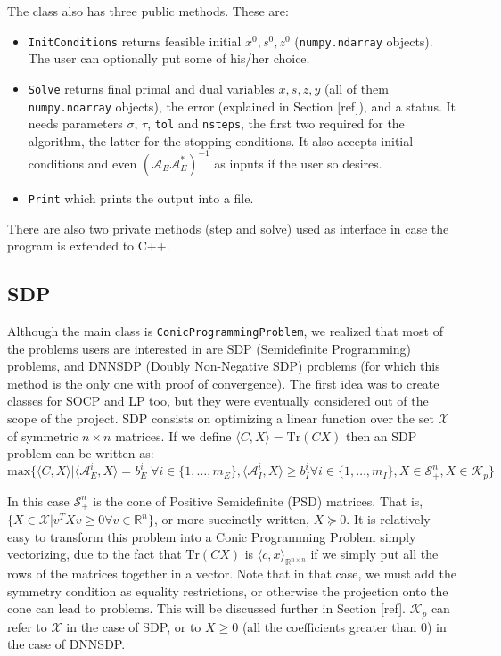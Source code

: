 \documentclass[paper=a4, fontsize=11pt]{scrartcl}
\numberwithin{equation}{section}		%
\numberwithin{figure}{section}			%
\numberwithin{table}{section}				%
\begin{document}
The class also has three public methods. These are:
\begin{itemize}
\item \texttt{InitConditions} returns feasible initial $x^0,s^0,z^0$ (\texttt{numpy.ndarray} objects). The user can optionally put some of his/her choice.
\item \texttt{Solve} returns final primal and dual variables $x,s,z,y$ (all of them \texttt{numpy.ndarray} objects), the error (explained in Section [ref]), and a status. It needs parameters $\sigma$, $\tau$, \texttt{tol} and \texttt{nsteps}, the first two required for the algorithm, the latter for the stopping conditions. It also accepts initial conditions and even $(\mathcal{A}_E\mathcal{A}_E^*)^{-1}$ as inputs if the user so desires.
\item \texttt{Print} which prints the output into a file.
\end{itemize}

There are also two private methods (step and solve) used as interface in case the program is extended to C++.
\subsection{SDP}

Although the main class is \texttt{ConicProgrammingProblem}, we realized that most of the problems users are interested in are SDP (Semidefinite Programming) problems, and DNNSDP (Doubly Non-Negative SDP) problems (for which this method is the only one with proof of convergence). The first idea was to create classes for SOCP and LP too, but they were eventually considered out of the scope of the project. SDP consists on optimizing a linear function over the set $\mathcal{X}$ of symmetric $n\times n$ matrices. If we define $\langle C, X \rangle = \text{Tr}(CX)$ then an SDP problem can be written as:
\begin{equation}
\text{max}\{\langle C, X\rangle | \langle\mathcal{A}^i_E, X\rangle = b_E^i \; \forall i \in \{1,\dots,m_{E}\}, \langle\mathcal{A}^i_I,X\rangle\geq b_I^i \forall i \in \{1,\dots,m_I\}, X \in \mathcal{S}^n_+, X \in \mathcal{K}_p\}  
\end{equation}

In this case $\mathcal{S}^n_+$ is the cone of Positive Semidefinite (PSD) matrices. That is, $\{X\in\mathcal{X} | v^T X v \geq 0 \forall v \in \mathbb{R}^n\}$, or more succinctly written, $X\succeq 0$. It is relatively easy to transform this problem into a Conic Programming Problem simply vectorizing, due to the fact that $\text{Tr}(CX)$ is $\langle c, x \rangle _{\mathbb{R}^{n\times n}}$ if we simply put all the rows of the matrices together in a vector. Note that in that case, we must add the symmetry condition as equality restrictions, or otherwise the projection onto the cone can lead to problems. This will be discussed further in Section [ref]. $\mathcal{K}_p$ can refer to $\mathcal{X}$ in the case of SDP, or to $X\geq 0$ (all the coefficients greater than $0$) in the case of DNNSDP. 
\end{document}
